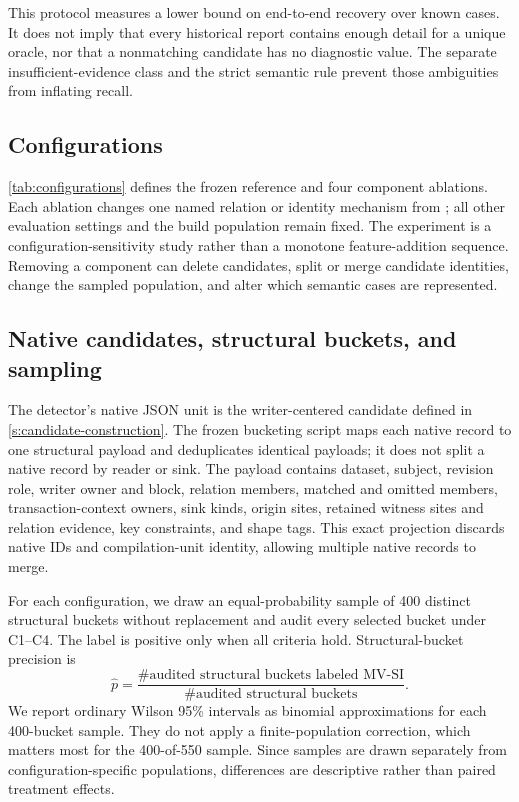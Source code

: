 This protocol measures a lower bound on end-to-end recovery over known cases. It does not imply that every historical report contains enough detail for a unique oracle, nor that a nonmatching candidate has no diagnostic value. The separate insufficient-evidence class and the strict semantic rule prevent those ambiguities from inflating recall.

\subsection{Configurations}
\label{s:evaluation-configurations}

\autoref{tab:configurations} defines the frozen reference and four component ablations. Each ablation changes one named relation or identity mechanism from ; all other evaluation settings and the build population remain fixed. The experiment is a configuration-sensitivity study rather than a monotone feature-addition sequence. Removing a component can delete candidates, split or merge candidate identities, change the sampled population, and alter which semantic cases are represented.



\subsection{Native candidates, structural buckets, and sampling}
\label{s:evaluation-bucketing}

The detector's native JSON unit is the writer-centered candidate defined in \autoref{s:candidate-construction}. The frozen bucketing script maps each native record to one structural payload and deduplicates identical payloads; it does not split a native record by reader or sink. The payload contains dataset, subject, revision role, writer owner and block, relation members, matched and omitted members, transaction-context owners, sink kinds, origin sites, retained witness sites and relation evidence, key constraints, and shape tags. This exact projection discards native IDs and compilation-unit identity, allowing multiple native records to merge.

For each configuration, we draw an equal-probability sample of 400 distinct structural buckets without replacement and audit every selected bucket under C1--C4. The label is positive only when all criteria hold. Structural-bucket precision is
\[
  \widehat{p} =
  \frac{\#\text{audited structural buckets labeled MV-SI}}
       {\#\text{audited structural buckets}}.
\]
We report ordinary Wilson 95\% intervals as binomial approximations for each 400-bucket sample. They do not apply a finite-population correction, which matters most for the 400-of-550  sample. Since samples are drawn separately from configuration-specific populations, differences are descriptive rather than paired treatment effects.

